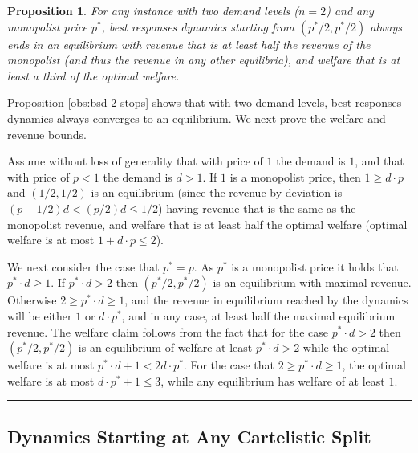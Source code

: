 \documentclass[11pt,a4paper]{article}
\newcommand{\qed}{\rule{1.5mm}{2mm}\vspace{0.1in}}
\newenvironment{proof}{\par\noindent{\bf Proof:}}{\qed}
\newtheorem{proposition}[theorem]{Proposition}
\begin{document}
\begin{proposition}
	For any instance with two demand levels ($n=2$) and any monopolist price $p^*$, best responses dynamics starting from $(p^*/2,p^*/2)$ always ends in an equilibrium with revenue that is at least half the revenue of the monopolist (and thus the revenue in any other equilibria), and welfare that is at least a third of the optimal welfare.
\end{proposition}
\begin{proof}
	Proposition \ref{obs:bsd-2-stops} shows that with two demand levels, best responses dynamics always converges to an equilibrium.
	We next prove the welfare and revenue bounds.
	
	
	Assume without loss of generality that with price of $1$ the demand is $1$, and that with price of $p<1$ the demand is $d>1$.
	If $1$ is a monopolist price, then $1\geq d\cdot p$ and $(1/2,1/2)$ is an equilibrium (since the revenue by deviation is
	$(p-1/2)d<(p/2) d\leq 1/2$) having revenue that is the same as the monopolist revenue, and welfare that is at least half the optimal welfare (optimal welfare is at most $1+d\cdot p\leq 2$).
	
	We next consider the case that $p^*=p$.
	As $p^*$ is a monopolist price it holds that $p^*\cdot d\geq 1$.
	If $p^*\cdot d>2$ then $(p^*/2,p^*/2)$ is an equilibrium with maximal revenue. Otherwise
	$2\geq p^*\cdot d\geq 1$, and the revenue in equilibrium reached by the dynamics %
	will be either $1$ or $d\cdot p^*$, and in any case, at least half the maximal equilibrium revenue.
	The welfare claim follows from the fact that for the case $p^*\cdot d>2$ then $(p^*/2,p^*/2)$ is an equilibrium of welfare at least $p^*\cdot d>2$ while the optimal welfare is at most $p^*\cdot d+1< 2d\cdot p^*$. For the case that $2\geq p^*\cdot d\geq 1$, the optimal welfare is at most $d\cdot p^* + 1\leq 3$, while any equilibrium has welfare of at least $1$.
\end{proof}


\subsection{Dynamics Starting at Any Cartelistic Split}
\label{app:cartel-prices}
\end{document}
